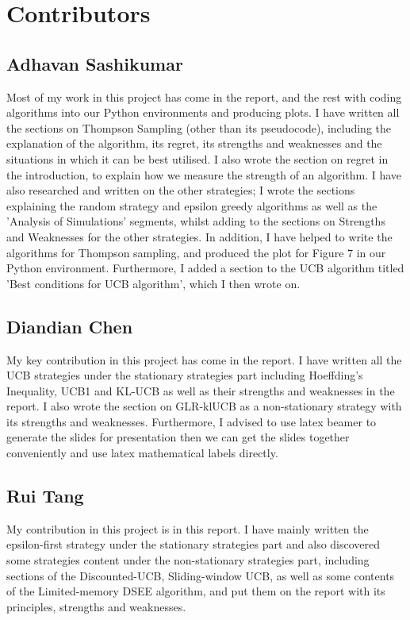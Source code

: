 \section{Contributors}\label{sec:contributors}

\subsection{Adhavan Sashikumar}\label{subsec:adhavan-sashikumar}
Most of my work in this project has come in the report, and the rest with coding algorithms into our Python environments and producing plots.
I have written all the sections on Thompson Sampling (other than its pseudocode), including the explanation of the algorithm, its regret, its strengths and weaknesses and the situations in which it can be best utilised.
I also wrote the section on regret in the introduction, to explain how we measure the strength of an algorithm.
I have also researched and written on the other strategies;
I wrote the sections explaining the random strategy and epsilon greedy algorithms as well as the 'Analysis of Simulations' segments, whilst adding to the sections on Strengths and Weaknesses for the other strategies.
In addition, I have helped to write the algorithms for Thompson sampling, and produced the plot for Figure 7 in our Python environment.
Furthermore, I added a section to the UCB algorithm titled 'Best conditions for UCB algorithm', which I then wrote on.

\subsection{Diandian Chen}\label{subsec:diandian-chen}
My key contribution in this project has come in the report.
I have written all the UCB strategies  under the stationary strategies part including Hoeffding's Inequality, UCB1 and KL-UCB as well as their strengths and weaknesses in the report.
I also wrote the section on GLR-klUCB as a non-stationary strategy with its strengths and weaknesses.
Furthermore, I advised to use latex beamer to generate the slides for presentation then we can get the slides together conveniently and use latex mathematical labels directly.
\subsection{Rui Tang}\label{subsec:rui-tang}
My contribution in this project is in this report.
\newline I have mainly written the epsilon-first strategy under the stationary strategies part and also discovered some strategies content under the non-stationary strategies part, including sections of the Discounted-UCB, Sliding-window UCB, as well as  some contents of the Limited-memory DSEE algorithm, and put them on the report with its principles, strengths and weaknesses.

